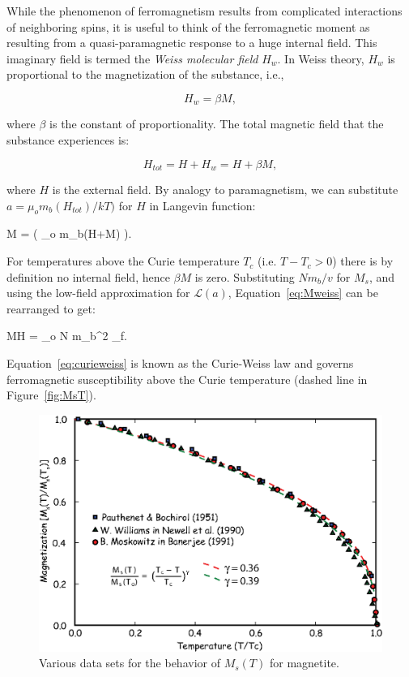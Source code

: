 {While the phenomenon of ferromagnetism results from complicated
interactions of neighboring spins, it is useful to think of the
ferromagnetic moment as resulting from a quasi-paramagnetic response to
a huge internal field.  This imaginary field is termed the 
{\it Weiss molecular field} $H_w$.  In 
Weiss theory, $H_w$ is proportional to the
magnetization of the substance, i.e., 

$$
H_w = \beta M,
$$

\noindent
where $\beta$ is the constant of proportionality.
The total magnetic field that the substance experiences is:

$$
H_{tot} = H + H_w = H + \beta M,
$$

\noindent where $H$ is the external field.  By analogy to paramagnetism,
we can substitute $a=\mu_om_b(H_{tot})/kT)$ for $H$ in
 Langevin function:

\beq
{M  } {=  \left({ {\mu_o m_b(H+\beta M)} } \right)}.
\label{eq:Mweiss}
\eeq

\noindent For temperatures above the Curie temperature $T_c$ (i.e.
$T-T_c>0$) there is by definition no internal field, hence  $\beta M$  is zero.
Substituting $N m_b/v$ for $M_s$, and using the low-field approximation
for $\mathcal{L} (a)$, Equation~\ref{eq:Mweiss} can 
be rearranged to get:

%
\beq
{M\over H} = { {\mu_o N m_b^2} } \equiv \chi_f.
\label{eq:curieweiss}
\eeq

\noindent
Equation~\ref{eq:curieweiss} is known as the Curie-Weiss law and governs
ferromagnetic susceptibility above the Curie temperature (dashed line in Figure~\ref{fig:MsT}). 

\begin{figure}[htb]
\centering  \includegraphics[width=11 cm]{EPSfiles/curie.eps}
\caption{Various data sets for  the behavior of $M_s(T)$ for magnetite.     }
\label{fig:curie}
\end{figure}
\nocite{pauthenet51,newell90,banerjee91}

}
